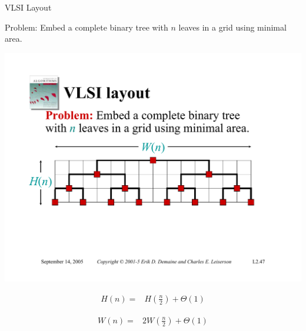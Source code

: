 \documentclass{beamer}
\begin{document}
\begin{frame}{VLSI Layout}
    \begin{exampleblock}{Problem:}
        Embed a complete binary tree with $n$ leaves in a grid using minimal area.
    \end{exampleblock}
    \pause
    \centering
    \includegraphics[width=\textwidth, trim={1cm 5cm 2cm 7cm}, clip]{pages/lec3_47}
    \begin{minipage}{0.48\textwidth}
        \pause
        \begin{equation*}
            \begin{split}
                H(n) =& H\left(\frac{n}{2}\right) + \Theta(1)
            \end{split}
        \end{equation*}
    \end{minipage}
    \hfill
    \begin{minipage}{0.48\textwidth}
        \pause
        \begin{equation*}
            \begin{split}
                W(n) =& 2W\left(\frac{n}{2}\right) + \Theta(1)
            \end{split}
        \end{equation*}
    \end{minipage}
\end{frame}
\end{document}
